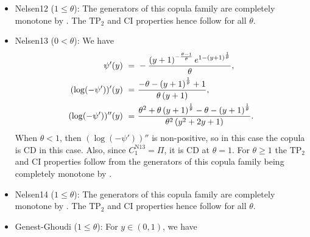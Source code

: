 \documentclass{article}
\newcommand{\TP}{\mathrm{TP_2}}
\begin{document}
\begin{itemize}
    \[
        \psi'(y) = - \frac{\left(2 - e^{y}\right)^{- \frac{\theta - 1}{\theta}} e^{y}}{\theta},
        \quad (\log(-\psi'))'(y) = \frac{- 2 \theta + e^{y}}{\theta \left(e^{y} - 2\right)},
        \quad (\log(-\psi'))''(y) = \frac{2 \left(\theta - 1\right) e^{y}}{\theta \left(e^{y} - 2\right)^2}
    .\]
    Since $\theta\leq 1/2$, $(\log(-\psi'))''$ is non-positive and hence the copula is CD.
    \item Nelsen12 ($1 \leq \theta$):
    The generators of this copula family are completely monotone by \cite[Table 2]{hofert2008sampling}.
    The $\TP$ and CI properties hence follow for all $\theta$.
    \item Nelsen13 ($0 < \theta$):
    We have
    \begin{align*}
        \psi'(y) ~=~ & - \frac{\left(y + 1\right)^{- \frac{\theta - 1}{\theta}} e^{1 - \left(y + 1\right)^{\frac1{\theta}}}}{\theta}, \allowdisplaybreaks\\
        (\log(-\psi'))'(y) ~=~ & \frac{- \theta - \left(y + 1\right)^{\frac1{\theta}} + 1}{\theta \left(y + 1\right)}, \allowdisplaybreaks\\
        (\log(-\psi'))''(y) ~=~ & \frac{\theta^2 + \theta \left(y + 1\right)^{\frac1{\theta}} - \theta - \left(y + 1\right)^{\frac1{\theta}}}{\theta^2 \left(y^2 + 2 y + 1\right)}
    .\end{align*}
    When $\theta < 1$, then $(\log(-\psi'))''$ is non-positive, so in this case the copula is CD in this case.
    Also, since $C^{\text{N13}}_{1} =\Pi $, it is CD at $\theta=1$.
    For $\theta\geq 1$ the $\TP$ and CI properties follow from the generators of this copula family being completely monotone by \cite[Table 2]{hofert2008sampling}.
    \item Nelsen14 ($1 \leq \theta$):
    The generators of this copula family are completely monotone by \cite[Table 2]{hofert2008sampling}.
    The $\TP$ and CI properties hence follow for all $\theta$.
    \item Genest-Ghoudi ($1 \leq \theta$):
    For $y\in(0,1)$, we have
    \begin{align*}

\end{align*}
\end{itemize}
\end{document}
